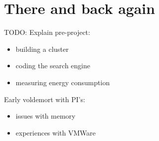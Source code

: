 \section{There and back again}
TODO: Explain pre-project:

\begin{itemize}
	\item building a cluster
 	\item coding the search engine
 	\item measuring energy consumption
\end{itemize}

Early voldemort with PI's:

\begin{itemize}
	\item issues with memory
 	\item experiences with VMWare
\end{itemize}
